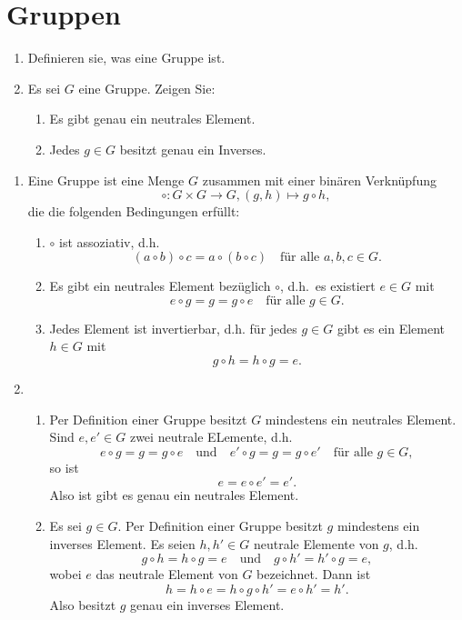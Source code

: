 \section{Gruppen}

\begin{question}
 \begin{enumerate}
  \item
   Definieren sie, was eine Gruppe ist.
  \item
   Es sei $G$ eine Gruppe. Zeigen Sie:
   \begin{enumerate}
    \item
     Es gibt genau ein neutrales Element.
    \item
     Jedes $g \in G$ besitzt genau ein Inverses.
   \end{enumerate}
 \end{enumerate}
\end{question}
\begin{solution}
 \begin{enumerate}
  \item
   Eine Gruppe ist eine Menge $G$ zusammen mit einer binären Verknüpfung
   \[
    \circ \colon G \times G \to G, (g,h) \mapsto g \circ h,
   \]
   die die folgenden Bedingungen erfüllt:
   \begin{enumerate}
    \item
     $\circ$ ist assoziativ, d.h.
     \[
      (a \circ b) \circ c = a \circ (b \circ c) \quad \text{für alle $a,b,c \in G$}.
     \]
    \item
     Es gibt ein neutrales Element bezüglich $\circ$, d.h.\ es existiert $e \in G$ mit
     \[
      e \circ g = g = g \circ e \quad \text{für alle $g \in G$}.
     \]
    \item
     Jedes Element ist invertierbar, d.h. für jedes $g \in G$ gibt es ein Element $h \in G$ mit
     \[
      g \circ h = h \circ g = e.
     \]
     \end{enumerate}
  \item
   \begin{enumerate}
    \item
     Per Definition einer Gruppe besitzt $G$ mindestens ein neutrales Element. Sind $e, e' \in G$ zwei neutrale ELemente, d.h.\
     \[
      e \circ g = g = g \circ e
      \quad\text{und}\quad
      e' \circ g = g = g \circ e'
      \quad
      \text{für alle $g \in G$},
     \]
     so ist
     \[
      e = e \circ e' = e'.
     \]
     Also ist gibt es genau ein neutrales Element.
    \item
     Es sei $g \in G$. Per Definition einer Gruppe besitzt $g$ mindestens ein inverses Element. Es seien $h, h' \in G$ neutrale Elemente von $g$, d.h.
     \[
      g \circ h = h \circ g = e
      \quad\text{und}\quad
      g \circ h' = h' \circ g = e,
     \]
     wobei $e$ das neutrale Element von $G$ bezeichnet. Dann ist
     \[
      h = h \circ e = h \circ g \circ h' = e \circ h' = h'.
     \]
    Also besitzt $g$ genau ein inverses Element.
   \end{enumerate}
 \end{enumerate} 
\end{solution}



